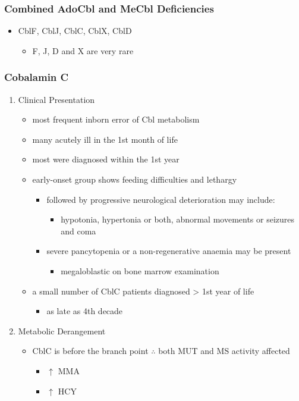 \documentclass[12pt]{scrartcl}
\begin{document}
\subsubsection{Combined AdoCbl and MeCbl Deficiencies}
\label{sec:orgaaa69af}
\begin{itemize}
\item CblF, CblJ, CblC, CblX, CblD
\begin{itemize}
\item F, J, D and X are very rare
\end{itemize}
\end{itemize}
\subsubsection{Cobalamin C}
\label{sec:org8a55304}
\begin{enumerate}
\item Clinical Presentation
\label{sec:org525e6ab}
\begin{itemize}
\item most frequent inborn error of Cbl metabolism
\item many acutely ill in the 1st month of life
\item most were diagnosed within the 1st year
\item early-onset group shows feeding difficulties and lethargy
\begin{itemize}
\item followed by progressive neurological deterioration may include: 
\begin{itemize}
\item hypotonia, hypertonia or both, abnormal movements or seizures
and coma
\end{itemize}
\item severe pancytopenia or a non-regenerative anaemia may be present
\begin{itemize}
\item megaloblastic on bone marrow examination
\end{itemize}
\end{itemize}
\item a small number of CblC patients diagnosed \textgreater{} 1st year of life
\begin{itemize}
\item as late as 4th decade
\end{itemize}
\end{itemize}

\item Metabolic Derangement
\label{sec:org806166f}
\begin{itemize}
\item CblC is before the branch point \(\therefore\) both MUT and MS activity affected
\begin{itemize}
\item \(\uparrow\) MMA
\item \(\uparrow\) HCY
\end{itemize}
\end{itemize}


\end{enumerate}
\end{document}
